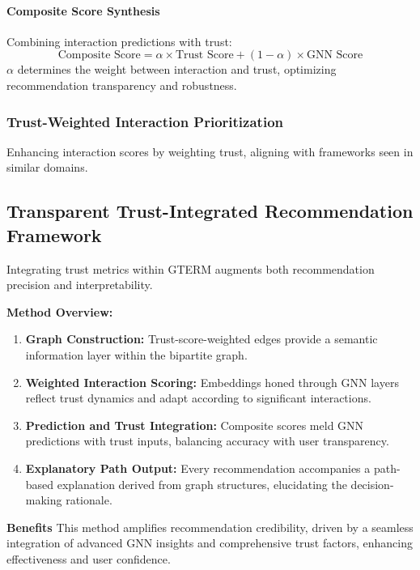 \paragraph{Composite Score Synthesis} Combining interaction predictions with trust:
\[
\text{Composite Score} = \alpha \times \text{Trust Score} + (1 - \alpha) \times \text{GNN Score}
\]
\(\alpha\) determines the weight between interaction and trust, optimizing recommendation transparency and robustness.

\subsubsection{Trust-Weighted Interaction Prioritization}

Enhancing interaction scores by weighting trust, aligning with frameworks seen in similar domains.

\subsection{Transparent Trust-Integrated Recommendation Framework}

Integrating trust metrics within GTERM augments both recommendation precision and interpretability.

\textbf{Method Overview:}

\begin{enumerate}
    \item \textbf{Graph Construction:} Trust-score-weighted edges provide a semantic information layer within the bipartite graph.
    
    \item \textbf{Weighted Interaction Scoring:} Embeddings honed through GNN layers reflect trust dynamics and adapt according to significant interactions.

    \item \textbf{Prediction and Trust Integration:} Composite scores meld GNN predictions with trust inputs, balancing accuracy with user transparency.

    \item \textbf{Explanatory Path Output:} Every recommendation accompanies a path-based explanation derived from graph structures, elucidating the decision-making rationale.
\end{enumerate}

\textbf{Benefits} This method amplifies recommendation credibility, driven by a seamless integration of advanced GNN insights and comprehensive trust factors, enhancing effectiveness and user confidence.
